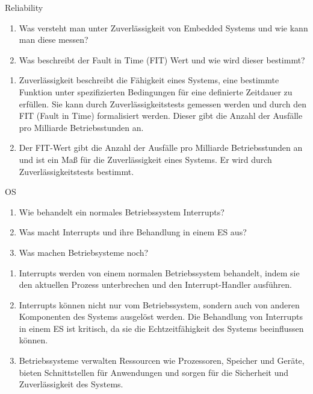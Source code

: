 \documentclass{article}
\begin{document}
\begin{exercise}{Reliability}
  \begin{enumerate}
    \item Was versteht man unter Zuverlässigkeit von Embedded Systems und wie kann man diese messen?
    \item Was beschreibt der Fault in Time (FIT) Wert und wie wird dieser bestimmt?
  \end{enumerate}

  \begin{solution}
    \begin{enumerate}
      \item Zuverlässigkeit beschreibt die Fähigkeit eines Systems, eine bestimmte Funktion unter spezifizierten Bedingungen für eine definierte Zeitdauer zu erfüllen. Sie kann durch Zuverlässigkeitstests gemessen werden und durch den FIT (Fault in Time) formalisiert werden. Dieser gibt die Anzahl der Ausfälle pro Milliarde Betriebsstunden an.
      \item Der FIT-Wert gibt die Anzahl der Ausfälle pro Milliarde Betriebsstunden an und ist ein Maß für die Zuverlässigkeit eines Systems. Er wird durch Zuverlässigkeitstests bestimmt.
    \end{enumerate}
  \end{solution}
\end{exercise}

\begin{exercise}{OS}
  \begin{enumerate}
    \item Wie behandelt ein normales Betriebssystem Interrupts?
    \item Was macht Interrupts und ihre Behandlung in einem ES aus?
    \item Was machen Betriebsysteme noch?
  \end{enumerate}

  \begin{solution}
    \begin{enumerate}
      \item Interrupts werden von einem normalen Betriebssystem behandelt, indem sie den aktuellen Prozess unterbrechen und den Interrupt-Handler ausführen.
      \item Interrupts können nicht nur vom Betriebssystem, sondern auch von anderen Komponenten des Systems ausgelöst werden. Die Behandlung von Interrupts in einem ES ist kritisch, da sie die Echtzeitfähigkeit des Systems beeinflussen können.
      \item Betriebssysteme verwalten Ressourcen wie Prozessoren, Speicher und Geräte, bieten Schnittstellen für Anwendungen und sorgen für die Sicherheit und Zuverlässigkeit des Systems.
    \end{enumerate}
  \end{solution}
\end{exercise}
\end{document}
